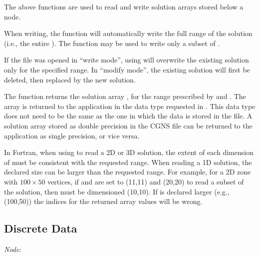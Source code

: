 The above functions are used to read and write solution arrays stored
below a  node.

When writing, the function  will
automatically write the full range of the solution (i.e., the entire
).
The function  may be used to write
only a subset of .

If the file was opened in ``write mode'', using
 will overwrite the existing solution
only for the specified range.
In ``modify mode'', the existing solution will first be deleted, then
replaced by the new solution.

The function  returns the solution array
, for the range prescribed by  and
.
The array is returned to the application in the data type requested in
.
This data type does not need to be the same as the one in which the data is
stored in the file.
A solution array stored as double precision in the CGNS file can be
returned to the application as single precision, or vice versa.

In Fortran, when using  to read a 2D or 3D
solution, the extent of each dimension of  must
be consistent with the requested range.
When reading a 1D solution, the declared size can be larger than the
requested range.
For example, for a 2D zone with $100 \times 50$ vertices, if
 and  are set to (11,11) and (20,20)
to read a subset of the solution, then  must be
dimensioned (10,10).
If  is declared larger (e.g., (100,50)) the
indices for the returned array values will be wrong.

\subsection{Discrete Data}
\label{s:discretedata}

\noindent
\textit{Node}: 

